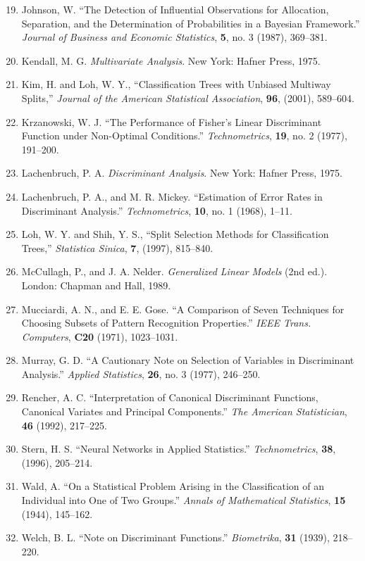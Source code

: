 
\begin{enumerate}
\setcounter{enumi}{18}
\item Johnson, W. “The Detection of Influential Observations for Allocation, Separation, and the Determination of Probabilities in a Bayesian Framework.” \textit{Journal of Business and Economic Statistics}, \textbf{5}, no. 3 (1987), 369--381.
\item Kendall, M. G. \textit{Multivariate Analysis}. New York: Hafner Press, 1975.
\item Kim, H. and Loh, W. Y., “Classification Trees with Unbiased Multiway Splits,” \textit{Journal of the American Statistical Association}, \textbf{96}, (2001), 589--604.
\item Krzanowski, W. J. “The Performance of Fisher's Linear Discriminant Function under Non-Optimal Conditions.” \textit{Technometrics}, \textbf{19}, no. 2 (1977), 191--200.
\item Lachenbruch, P. A. \textit{Discriminant Analysis}. New York: Hafner Press, 1975.
\item Lachenbruch, P. A., and M. R. Mickey. “Estimation of Error Rates in Discriminant Analysis.” \textit{Technometrics}, \textbf{10}, no. 1 (1968), 1--11.
\item Loh, W. Y. and Shih, Y. S., “Split Selection Methods for Classification Trees,” \textit{Statistica Sinica}, \textbf{7}, (1997), 815--840.
\item McCullagh, P., and J. A. Nelder. \textit{Generalized Linear Models} (2nd ed.). London: Chapman and Hall, 1989.
\item Mucciardi, A. N., and E. E. Gose. “A Comparison of Seven Techniques for Choosing Subsets of Pattern Recognition Properties.” \textit{IEEE Trans. Computers}, \textbf{C20} (1971), 1023--1031.
\item Murray, G. D. “A Cautionary Note on Selection of Variables in Discriminant Analysis.” \textit{Applied Statistics}, \textbf{26}, no. 3 (1977), 246--250.
\item Rencher, A. C. “Interpretation of Canonical Discriminant Functions, Canonical Variates and Principal Components.” \textit{The American Statistician}, \textbf{46} (1992), 217--225.
\item Stern, H. S. “Neural Networks in Applied Statistics.” \textit{Technometrics}, \textbf{38}, (1996), 205--214.
\item Wald, A. “On a Statistical Problem Arising in the Classification of an Individual into One of Two Groups.” \textit{Annals of Mathematical Statistics}, \textbf{15} (1944), 145--162.
\item Welch, B. L. “Note on Discriminant Functions.” \textit{Biometrika}, \textbf{31} (1939), 218--220.
\end{enumerate}
